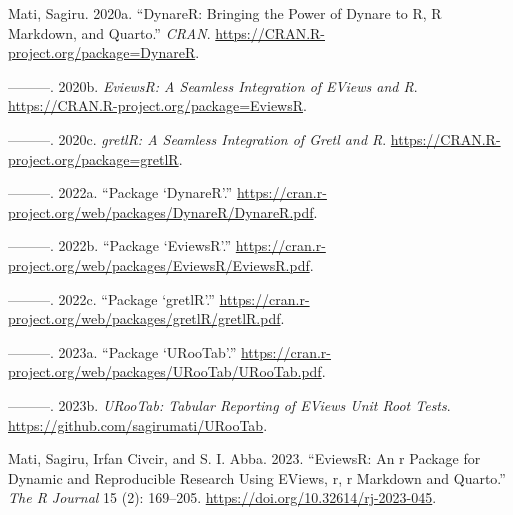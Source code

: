 \documentclass[
  letterpaper,
  DIV=11,
  numbers=noendperiod]{scrartcl}
\newlength{\cslhangindent}
\newlength{\cslentryspacingunit} %
\newenvironment{CSLReferences}[2] %
 {%
  \setlength{\parindent}{0pt}
  \ifodd #1
  \let\oldpar\par
  \def\par{\hangindent=\cslhangindent\oldpar}
  \fi
  \setlength{\parskip}{#2\cslentryspacingunit}
 }%
 {}
\begin{document}
\hypertarget{refs}{}
\begin{CSLReferences}{1}{0}
\leavevmode{}%
Mati, Sagiru. 2020a. {``DynareR: Bringing the Power of Dynare to {R, R
Markdown, and Quarto}.''} \emph{CRAN}.
\url{https://CRAN.R-project.org/package=DynareR}.

\leavevmode{}%
---------. 2020b. \emph{EviewsR: A Seamless Integration of {EViews} and
{R}}. \url{https://CRAN.R-project.org/package=EviewsR}.

\leavevmode{}%
---------. 2020c. \emph{gretlR: A Seamless Integration of {Gretl} and
{R}}. \url{https://CRAN.R-project.org/package=gretlR}.

\leavevmode{}%
---------. 2022a. {``Package {`DynareR'}.''}
\url{https://cran.r-project.org/web/packages/DynareR/DynareR.pdf}.

\leavevmode{}%
---------. 2022b. {``Package {`EviewsR'}.''}
\url{https://cran.r-project.org/web/packages/EviewsR/EviewsR.pdf}.

\leavevmode{}%
---------. 2022c. {``Package {`gretlR'}.''}
\url{https://cran.r-project.org/web/packages/gretlR/gretlR.pdf}.

\leavevmode{}%
---------. 2023a. {``Package {`URooTab'}.''}
\url{https://cran.r-project.org/web/packages/URooTab/URooTab.pdf}.

\leavevmode{}%
---------. 2023b. \emph{{URooTab}: Tabular Reporting of {EViews} Unit
Root Tests}. \url{https://github.com/sagirumati/URooTab}.

\leavevmode{}%
Mati, Sagiru, Irfan Civcir, and S. I. Abba. 2023. {``{EviewsR}: An r
Package for Dynamic and Reproducible Research Using {EViews}, r, r
Markdown and Quarto.''} \emph{The R Journal} 15 (2): 169--205.
\url{https://doi.org/10.32614/rj-2023-045}.

\end{CSLReferences}
\end{document}
